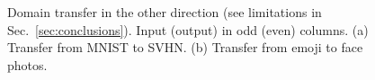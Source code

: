 \documentclass{article} %
\begin{document}
\begin{figure}[H]
\centering
{}
\caption{\label{fig:rev}Domain transfer in the other direction (see limitations in Sec.~\ref{sec:conclusions}). Input (output) in odd (even) columns. (a) Transfer from MNIST to SVHN. (b) Transfer from emoji to face photos.}
\end{figure}
\vspace{-.2in}
\end{document}

